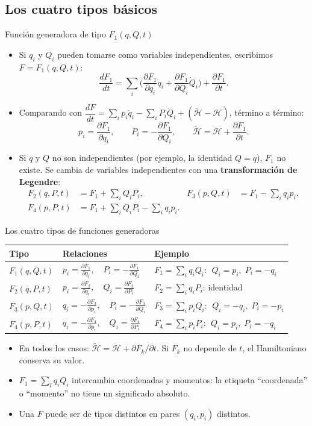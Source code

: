 \documentclass[spanish]{beamer}
\newcommand{\Ham}{\mathcal{H}}               %
\newcommand{\tH}{\tilde{\mathcal{H}}}        %
\newcommand{\pd}[2]{\frac{\partial #1}{\partial #2}}
\begin{document}
\subsection{Los cuatro tipos básicos}
\begin{frame}{Función generadora de tipo $F_1(q,Q,t)$}
\begin{itemize}[<+->]
  \item Si $q_i$ y $Q_i$ pueden tomarse como variables independientes, escribimos
        $F=F_1(q,Q,t)$:
        \[
          \frac{dF_1}{dt}=\sum_i\Big(\pd{F_1}{q_i}\dot q_i+\pd{F_1}{Q_i}\dot Q_i\Big)+\pd{F_1}{t}.
        \]
  \item Comparando con $\dfrac{dF}{dt}=\sum_i p_i\dot q_i-\sum_i P_i\dot Q_i+(\tH-\Ham)$,
        término a término:
        \[
          p_i=\pd{F_1}{q_i},\qquad P_i=-\pd{F_1}{Q_i},\qquad \tH=\Ham+\pd{F_1}{t}.
        \]
  \item Si $q$ y $Q$ no son independientes (por ejemplo, la identidad $Q=q$),
        $F_1$ no existe. Se cambia de variables independientes con una
        \textbf{transformación de Legendre}:
        \begin{align*}
          F_2(q,P,t)&=F_1+\textstyle\sum_i Q_iP_i, &
          F_3(p,Q,t)&=F_1-\textstyle\sum_i q_ip_i,\\
          F_4(p,P,t)&=F_1+\textstyle\sum_i Q_iP_i-\sum_i q_ip_i .
        \end{align*}
\end{itemize}
\end{frame}

\begin{frame}{Los cuatro tipos de funciones generadoras}
\small
\renewcommand{\arraystretch}{1.7}
\begin{tabular}{@{}lll@{}}
  \toprule
  \textbf{Tipo} & \textbf{Relaciones} & \textbf{Ejemplo} \\
  \midrule
  $F_1(q,Q,t)$ & $p_i=\pd{F_1}{q_i},\quad P_i=-\pd{F_1}{Q_i}$
               & $F_1=\sum_i q_iQ_i$: $\;Q_i=p_i,\;P_i=-q_i$ \\
  $F_2(q,P,t)$ & $p_i=\pd{F_2}{q_i},\quad Q_i=\pd{F_2}{P_i}$
               & $F_2=\sum_i q_iP_i$: identidad \\
  $F_3(p,Q,t)$ & $q_i=-\pd{F_3}{p_i},\quad P_i=-\pd{F_3}{Q_i}$
               & $F_3=\sum_i p_iQ_i$: $\;Q_i=-q_i,\;P_i=-p_i$ \\
  $F_4(p,P,t)$ & $q_i=-\pd{F_4}{p_i},\quad Q_i=\pd{F_4}{P_i}$
               & $F_4=\sum_i p_iP_i$: $\;Q_i=p_i,\;P_i=-q_i$ \\
  \bottomrule
\end{tabular}
\medskip
\begin{itemize}
  \item En todos los casos: $\tH=\Ham+\partial F_k/\partial t$. Si $F_k$ no depende de $t$,
        el Hamiltoniano conserva su valor.
  \item $F_1=\sum_i q_iQ_i$ intercambia coordenadas y momentos: la etiqueta
        “coordenada” o “momento” no tiene un significado absoluto.
  \item Una $F$ puede ser de tipos distintos en pares $(q_i,p_i)$ distintos.
\end{itemize}
\end{frame}
\end{document}
